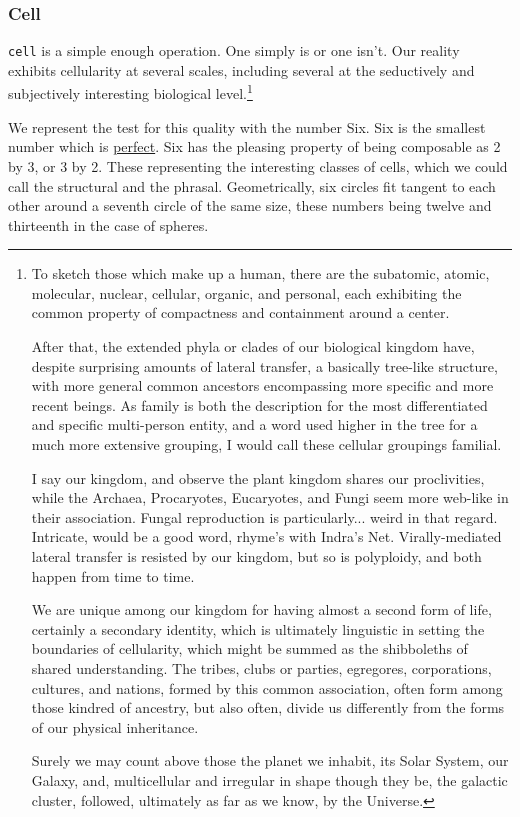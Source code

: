 \documentclass[twoside]{article}
\begin{document}
\subsubsection{Cell}

\texttt{cell} is a simple enough operation. One simply is or one isn't. Our reality exhibits cellularity at several scales, including several at the seductively and subjectively interesting biological level.\footnote{To sketch those which make up a human, there are the subatomic, atomic, molecular, nuclear, cellular, organic, and personal, each exhibiting the common property of compactness and containment around a center.

After that, the extended phyla or clades of our biological kingdom have, despite surprising amounts of lateral transfer, a basically tree-like structure, with more general common ancestors encompassing more specific and more recent beings. As family is both the description for the most differentiated and specific multi-person entity, and a word used higher in the tree for a much more extensive grouping, I would call these cellular groupings familial.

I say our kingdom, and observe the plant kingdom shares our proclivities, while the Archaea, Procaryotes, Eucaryotes, and Fungi seem more web-like in their association. Fungal reproduction is particularly... weird in that regard. Intricate, would be a good word, rhyme's with Indra's Net. Virally-mediated lateral transfer is resisted by our kingdom, but so is polyploidy, and both happen from time to time.

We are unique among our kingdom for having almost a second form of life, certainly a secondary identity, which is ultimately linguistic in setting the boundaries of cellularity, which might be summed as the shibboleths of shared understanding. The tribes, clubs or parties, egregores, corporations, cultures, and nations, formed by this common association, often form among those kindred of ancestry, but also often, divide us differently from the forms of our physical inheritance.

Surely we may count above those the planet we inhabit, its Solar System, our Galaxy, and, multicellular and irregular in shape though they be, the galactic cluster, followed, ultimately as far as we know, by the Universe.}

We represent the test for this quality with the number Six.  Six is the smallest number which is \href{https://en.wikipedia.org/wiki/Perfect_number}{perfect}.  Six has the pleasing property of being composable as 2 by 3, or 3 by 2. These representing the interesting classes of cells, which we could call the structural and the phrasal. Geometrically, six circles fit tangent to each other around a seventh circle of the same size, these numbers being twelve and thirteenth in the case of spheres.
\end{document}
